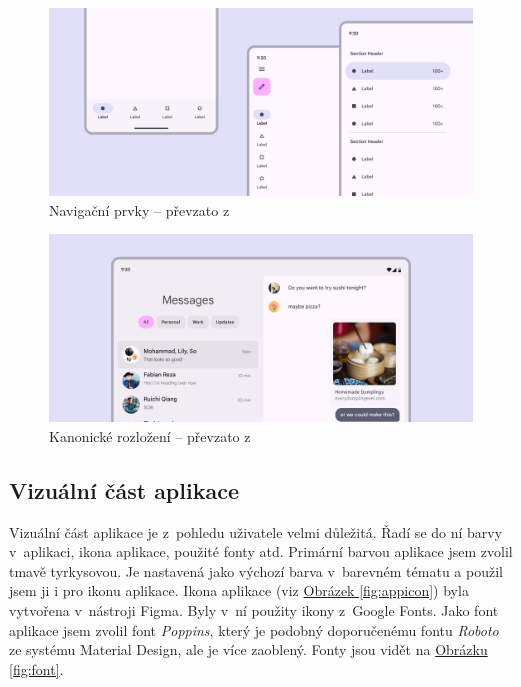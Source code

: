 \documentclass[
  biblatex,
  figures=true,
  tables=false,
  glossaries,
  index
]{kidiplom}
\begin{document}
\begin{figure}
  \centering 
  \includegraphics[width=\textwidth]{images/navigation.png}
  \caption{Navigační prvky -- převzato z~\cite{m3}}
  \label{fig:navigation}
\end{figure}

\begin{figure}
  \centering 
  \includegraphics[width=\textwidth]{images/canonical-layout.png}
  \caption{Kanonické rozložení -- převzato z~\cite{m3}}
  \label{fig:canonical-layout}
\end{figure}

\subsection{Vizuální část aplikace}
Vizuální část aplikace je z~pohledu uživatele velmi důležitá. Řadí se do ní barvy v~aplikaci, ikona aplikace, použité fonty atd. Primární barvou aplikace jsem zvolil tmavě tyrkysovou. Je nastavená jako výchozí barva v~barevném tématu a použil jsem ji i pro ikonu aplikace. Ikona aplikace (viz \hyperref[fig:appicon]{Obrázek \ref{fig:appicon}}) byla vytvořena v~nástroji Figma. Byly v~ní použity ikony z~Google Fonts. Jako font aplikace jsem zvolil font \textit{Poppins}, který je podobný doporučenému fontu \textit{Roboto} ze systému Material Design, ale je více zaoblený. Fonty jsou vidět na \hyperref[fig:font]{Obrázku \ref{fig:font}}. 
\end{document}
